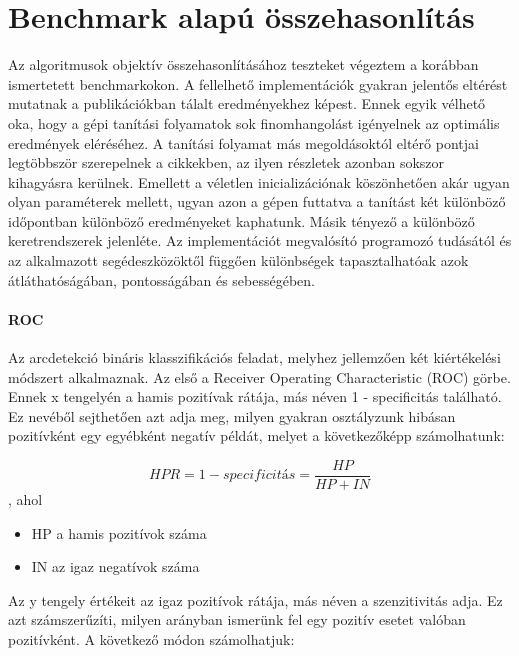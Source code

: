 \section{Benchmark alapú összehasonlítás}
Az algoritmusok objektív összehasonlításához teszteket végeztem a korábban ismertetett benchmarkokon. A fellelhető implementációk gyakran jelentős eltérést mutatnak a publikációkban tálalt eredményekhez képest. Ennek egyik vélhető oka, hogy a gépi tanítási folyamatok sok finomhangolást igényelnek az optimális eredmények eléréséhez. A tanítási folyamat más megoldásoktól eltérő pontjai legtöbbször szerepelnek a cikkekben, az ilyen részletek azonban sokszor kihagyásra kerülnek. Emellett a véletlen inicializációnak köszönhetően akár ugyan olyan paraméterek mellett, ugyan azon a gépen futtatva a tanítást két különböző időpontban különböző eredményeket kaphatunk. Másik tényező a különböző keretrendszerek jelenléte. Az implementációt megvalósító programozó tudásától és az alkalmazott segédeszközöktől függően különbségek tapasztalhatóak azok átláthatóságában, pontosságában és sebességében.

\paragraph{ROC}\hfill

Az arcdetekció bináris klasszifikációs feladat, melyhez jellemzően két kiértékelési módszert alkalmaznak. Az első a Receiver Operating Characteristic (ROC) görbe. Ennek x tengelyén a hamis pozitívak rátája, más néven 1 - specificitás található. Ez nevéből sejthetően azt adja meg, milyen gyakran osztályzunk hibásan pozitívként egy egyébként negatív példát, melyet a következőképp számolhatunk:

\begin{equation}
    HPR = 1 - specificitás = \frac{HP}{HP + IN}
\end{equation},
ahol
\begin{itemize}
    \item HP a hamis pozitívok száma
    \item IN az igaz negatívok száma
\end{itemize}

Az y tengely értékeit az igaz pozitívok rátája, más néven a szenzitivitás adja. Ez azt számszerűzíti, milyen arányban ismerünk fel egy pozitív esetet valóban pozitívként. A következő módon számolhatjuk:

